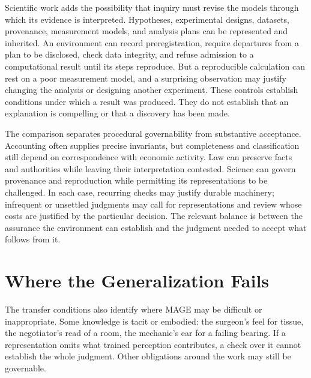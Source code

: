 Scientific work adds the possibility that inquiry must revise the models through which its evidence is interpreted. Hypotheses, experimental designs, datasets, provenance, measurement models, and analysis plans can be represented and inherited. An environment can record preregistration, require departures from a plan to be disclosed, check data integrity, and refuse admission to a computational result until its steps reproduce. But a reproducible calculation can rest on a poor measurement model, and a surprising observation may justify changing the analysis or designing another experiment. These controls establish conditions under which a result was produced. They do not establish that an explanation is compelling or that a discovery has been made.

The comparison separates procedural governability from substantive acceptance. Accounting often supplies precise invariants, but completeness and classification still depend on correspondence with economic activity. Law can preserve facts and authorities while leaving their interpretation contested. Science can govern provenance and reproduction while permitting its representations to be challenged. In each case, recurring checks may justify durable machinery; infrequent or unsettled judgments may call for representations and review whose costs are justified by the particular decision. The relevant balance is between the assurance the environment can establish and the judgment needed to accept what follows from it.

\section{Where the Generalization Fails}\label{heading:where-the-generalization-fails}

The transfer conditions also identify where MAGE may be difficult or inappropriate. Some knowledge is tacit or embodied: the surgeon's feel for tissue, the negotiator's read of a room, the mechanic's ear for a failing bearing. If a representation omits what trained perception contributes, a check over it cannot establish the whole judgment. Other obligations around the work may still be governable.

